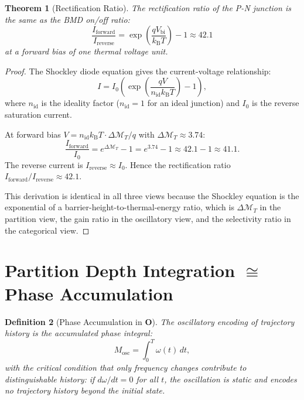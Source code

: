 \documentclass[twocolumn,10pt]{article}
\newtheorem{theorem}{Theorem}[section]
\newtheorem{definition}[theorem]{Definition}
\theoremstyle{remark}
\newcommand{\kB}{k_{\mathrm{B}}}
\newcommand{\Depth}{\mathcal{M}}
\newcommand{\CatO}{\mathbf{O}}
\begin{document}
\begin{theorem}[Rectification Ratio]
\label{thm:rectification}
The rectification ratio of the P-N junction is the same as the BMD on/off ratio:
\begin{equation}
\frac{I_{\mathrm{forward}}}{I_{\mathrm{reverse}}} = \exp\!\left(\frac{qV_{\mathrm{bi}}}{\kB T}\right) - 1 \approx 42.1
\label{eq:rectification}
\end{equation}
at a forward bias of one thermal voltage unit.
\end{theorem}

\begin{proof}
The Shockley diode equation \cite{shockley1949} gives the current-voltage relationship:
\begin{equation}
I = I_0\!\left(\exp\!\left(\frac{qV}{n_{\mathrm{id}}\kB T}\right) - 1\right),
\label{eq:shockley}
\end{equation}
where $n_{\mathrm{id}}$ is the ideality factor ($n_{\mathrm{id}} = 1$ for an ideal junction) and $I_0$ is the reverse saturation current.

At forward bias $V = n_{\mathrm{id}}\kB T \cdot \Delta\Depth_T / q$ with $\Delta\Depth_T \approx 3.74$:
\begin{equation}
\frac{I_{\mathrm{forward}}}{I_0} = e^{\Delta\Depth_T} - 1 = e^{3.74} - 1 \approx 42.1 - 1 \approx 41.1.
\end{equation}
The reverse current is $I_{\mathrm{reverse}} \approx I_0$.
Hence the rectification ratio $I_{\mathrm{forward}}/I_{\mathrm{reverse}} \approx 42.1$.

This derivation is identical in all three views because the Shockley equation is the exponential of a barrier-height-to-thermal-energy ratio, which is $\Delta\Depth_T$ in the partition view, the gain ratio in the oscillatory view, and the selectivity ratio in the categorical view.
\end{proof}

\section{\texorpdfstring{Partition Depth Integration $\cong$ Phase Accumulation}{Partition Depth Integration = Phase Accumulation}}
\label{sec:memory}

\begin{definition}[Phase Accumulation in $\CatO$]
\label{def:memory_O}
The oscillatory encoding of trajectory history is the accumulated phase integral:
\begin{equation}
M_{\mathrm{osc}} = \int_0^T \omega(t)\,dt,
\label{eq:M_osc}
\end{equation}
with the critical condition that only frequency \emph{changes} contribute to distinguishable history: if $d\omega/dt = 0$ for all $t$, the oscillation is static and encodes no trajectory history beyond the initial state.
\end{definition}
\end{document}
